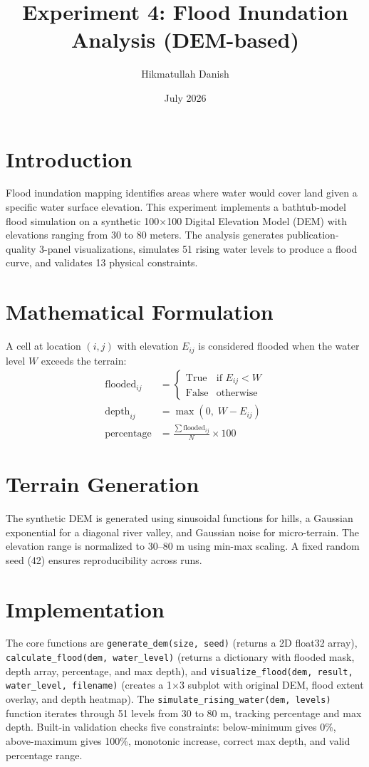 \documentclass[12pt,a4paper]{article}
\title{Experiment 4: Flood Inundation Analysis (DEM-based)}
\author{Hikmatullah Danish \quad 3125999089}
\date{July 2026}
\begin{document}
\maketitle

\section{Introduction}
Flood inundation mapping identifies areas where water would cover land given a specific water surface elevation. This experiment implements a bathtub-model flood simulation on a synthetic 100$\times$100 Digital Elevation Model (DEM) with elevations ranging from 30 to 80 meters. The analysis generates publication-quality 3-panel visualizations, simulates 51 rising water levels to produce a flood curve, and validates 13 physical constraints.

\section{Mathematical Formulation}
A cell at location $(i,j)$ with elevation $E_{ij}$ is considered flooded when the water level $W$ exceeds the terrain:
\begin{align}
\text{flooded}_{ij} &= \begin{cases}
\text{True} & \text{if } E_{ij} < W \\
\text{False} & \text{otherwise}
\end{cases} \\
\text{depth}_{ij} &= \max(0,\; W - E_{ij}) \\
\text{percentage} &= \frac{\sum \text{flooded}_{ij}}{N} \times 100
\end{align}

\section{Terrain Generation}
The synthetic DEM is generated using sinusoidal functions for hills, a Gaussian exponential for a diagonal river valley, and Gaussian noise for micro-terrain. The elevation range is normalized to 30–80 m using min-max scaling. A fixed random seed (42) ensures reproducibility across runs.

\section{Implementation}
The core functions are \texttt{generate\_dem(size, seed)} (returns a 2D float32 array), \texttt{calculate\_flood(dem, water\_level)} (returns a dictionary with flooded mask, depth array, percentage, and max depth), and \texttt{visualize\_flood(dem, result, water\_level, filename)} (creates a 1$\times$3 subplot with original DEM, flood extent overlay, and depth heatmap). The \texttt{simulate\_rising\_water(dem, levels)} function iterates through 51 levels from 30 to 80 m, tracking percentage and max depth. Built-in validation checks five constraints: below-minimum gives 0\%, above-maximum gives 100\%, monotonic increase, correct max depth, and valid percentage range.
\end{document}
